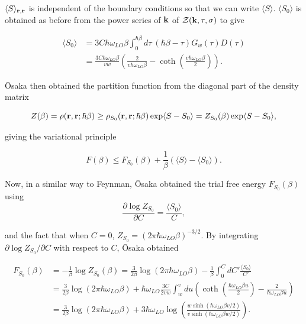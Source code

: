 $ \langle S \rangle_{\vb{r}, \vb{r}}$ is independent of the boundary conditions so that we can write $\langle S \rangle$. $\langle S_0 \rangle$ is obtained as before from the power series of $\vb{k}$ of $\mathcal{Z}(\vb{k}, \tau, \sigma)$ to give

\begin{equation}
    \begin{aligned}
        \langle S_0 \rangle &= 3C\hbar\omega_{LO}\beta \int^{\hbar\beta}_0 d\tau\ (\hbar\beta - \tau) G_w(\tau) D(\tau) \\
        &= \frac{3C \hbar \omega_{LO} \beta}{vw} \left(\frac{2}{v\hbar\omega_{LO}\beta} - \coth\left(\frac{v\hbar\omega_{LO}\beta}{2}\right) \right).
    \end{aligned}
\end{equation}

\=Osaka then obtained the partition function from the diagonal part of the density matrix

\begin{equation}
    Z(\beta) = \rho(\vb{r}, \vb{r}; \hbar\beta) \geq \rho_{S_0}(\vb{r}, \vb{r}; \hbar\beta) \exp\langle S - S_0 \rangle = Z_{S_0}(\beta) \exp\langle S - S_0 \rangle,
\end{equation}

giving the variational principle

\begin{equation}\label{eqn:osaka_var}
    F(\beta) \leq F_{S_0}(\beta) + \frac{1}{\beta} \left( \langle S\rangle - \langle S_0 \rangle \right).
\end{equation}

Now, in a similar way to Feynman, \=Osaka obtained the trial free energy $F_{S_0}(\beta)$ using
\begin{equation}
     \frac{\partial \log Z_{S_0}}{\partial C} = \frac{\langle S_0 \rangle}{C},
\end{equation}

and the fact that when $C = 0$, $Z_{S_0} = (2\pi\hbar\omega_{LO}\beta)^{-3/2}$. By integrating $\partial \log Z_{S_0} / \partial C$ with respect to $C$, \=Osaka obtained

\begin{equation}\label{eqn:osaka_trial_fenergy}
\begin{aligned}
    F_{S_0}(\beta) &= -\frac{1}{\beta} \log Z_{S_0}(\beta) = \frac{3}{2\beta} \log(2\pi\hbar\omega_{LO}\beta) - \frac{1}{\beta}\int^C_0 dC' \frac{\langle S_0 \rangle}{C'} \\
    &= \frac{3}{2\beta} \log(2\pi\hbar\omega_{LO}\beta) + \hbar\omega_{LO} \frac{3C}{2vw} \int_w^v du \left( \coth \left( \frac{\hbar\omega_{LO} \beta u}{2}\right) - \frac{2}{\hbar\omega_{LO}\beta u} \right) \\
    &= \frac{3}{2\beta} \log(2\pi\hbar\omega_{LO}\beta) + 3 \hbar \omega_{LO} \log \left( \frac{w \sinh \left( \hbar\omega_{LO} \beta v / 2 \right)}{v \sinh \left( \hbar\omega_{LO} \beta w / 2 \right)} \right).
\end{aligned}
\end{equation}

